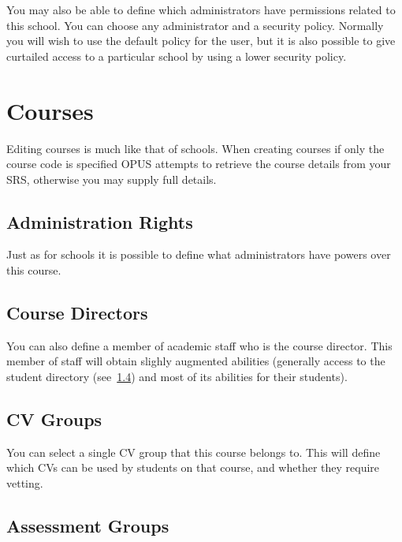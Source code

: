 \documentclass[12 pt]{book}
\begin{document}
You may also be able to define which administrators have permissions related to this
school. You can choose any administrator and a security policy. Normally you will
wish to use the default policy for the user, but it is also possible to give
curtailed access to a particular school by using a lower security policy.


\section{Courses}

Editing courses is much like that of schools. When creating courses if only the
course code is specified OPUS attempts to retrieve the course details from your
SRS, otherwise you may supply full details.

\subsection{Administration Rights}

Just as for schools it is possible to define what administrators have powers over
this course.


\subsection{Course Directors}

You can also define a member of academic staff who is the course director. This
member of staff will obtain slighly augmented abilities (generally access to the
student directory (see~\ref{}) and most of its abilities for their students).

\subsection{CV Groups}

You can select a single CV group that this course belongs to. This will define
which CVs can be used by students on that course, and whether they require vetting.

\subsection{Assessment Groups}
\end{document}
